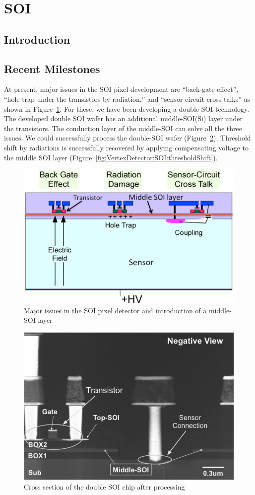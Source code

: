 \section{SOI}
\subsection{Introduction}
\subsection{Recent Milestones}
At present, major issues in the SOI pixel development are ``back-gate effect'', ``hole trap under the transistors by radiation,'' and ``sensor-circuit cross talks'' as shown in Figure~\ref{fig:VertexDetector:SOI:SOI_Schematic}. For these, we have been developing a double SOI technology. The developed double SOI wafer has an additional middle-SOI(Si) layer under the transistors. The conduction layer of the middle-SOI can solve all the three issues. We could successfully process the double-SOI wafer (Figure~\ref{fig:VertexDetector:SOI:crossSectionAfterProcessing}). Threshold shift by radiations is successfully recovered by applying compensating voltage to the middle SOI layer (Figure~\ref{fig:VertexDetector:SOI:thresholdShift}).

\begin{figure}
\centering
\includegraphics[width=.5\textwidth]{VertexDetector/SOI/SOI_Schematic}
\caption{Major issues in the SOI pixel detector and introduction of a middle-SOI layer}
\label{fig:VertexDetector:SOI:SOI_Schematic}
\end{figure}

\begin{figure}
\centering
\includegraphics[width=.5\textwidth]{VertexDetector/SOI/crossSectionAfterProcessing}
\caption{Cross section of the double SOI chip after processing}
\label{fig:VertexDetector:SOI:crossSectionAfterProcessing}
\end{figure}

